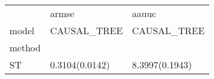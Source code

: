 \begin{tabular}{lll}
\toprule
{} &           armse &           aauuc \\
model &     CAUSAL\_TREE &     CAUSAL\_TREE \\
method &                 &                 \\
\midrule
ST     &  0.3104(0.0142) &  8.3997(0.1943) \\
\bottomrule
\end{tabular}
